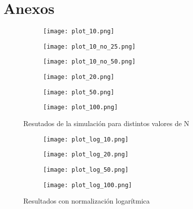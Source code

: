 \documentclass{article}
\begin{document}
\newpage
\section{Anexos}


\begin{figure}[hbt!]

\begin{subfigure}{.475\linewidth}
    \texttt{[image: plot\_10.png]}
    \caption{}
\end{subfigure}
\begin{subfigure}{.475\linewidth}
    \texttt{[image: plot\_10\_no\_25.png]}
    \caption{}
\end{subfigure}

\medskip
\begin{subfigure}{.475\linewidth}
    \texttt{[image: plot\_10\_no\_50.png]}
    \caption{}
\end{subfigure}
\begin{subfigure}{.475\linewidth}
    \texttt{[image: plot\_20.png]}
    \caption{}
\end{subfigure}

\medskip
\begin{subfigure}{.475\linewidth}
    \texttt{[image: plot\_50.png]}
    \caption{}
\end{subfigure}
\begin{subfigure}{.475\linewidth}
    \texttt{[image: plot\_100.png]}
    \caption{}
\end{subfigure}

\caption{Resutados de la simulación para distintos valores de N}
\end{figure}


\begin{figure}[hbt!]

\begin{subfigure}{.475\linewidth}
    \texttt{[image: plot\_log\_10.png]}
    \caption{}
\end{subfigure}
\begin{subfigure}{.475\linewidth}
    \texttt{[image: plot\_log\_20.png]}
    \caption{}
\end{subfigure}

\medskip
\begin{subfigure}{.475\linewidth}
    \texttt{[image: plot\_log\_50.png]}
    \caption{}
\end{subfigure}
\begin{subfigure}{.475\linewidth}
    \texttt{[image: plot\_log\_100.png]}
    \caption{}
\end{subfigure}

\caption{Resultados con normalización logarítmica}
\end{figure}
\end{document}
